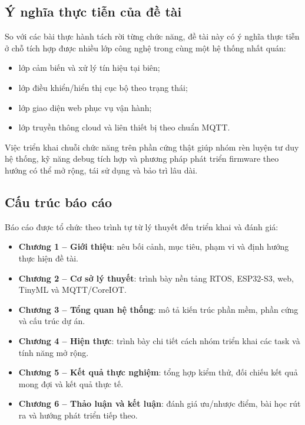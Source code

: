 \subsection{Ý nghĩa thực tiễn của đề tài}

So với các bài thực hành tách rời từng chức năng, đề tài này có ý nghĩa thực tiễn ở chỗ tích hợp được nhiều lớp công nghệ trong cùng một hệ thống nhất quán:
\begin{itemize}
    \item lớp cảm biến và xử lý tín hiệu tại biên;
    \item lớp điều khiển/hiển thị cục bộ theo trạng thái;
    \item lớp giao diện web phục vụ vận hành;
    \item lớp truyền thông cloud và liên thiết bị theo chuẩn MQTT.
\end{itemize}

Việc triển khai chuỗi chức năng trên phần cứng thật giúp nhóm rèn luyện tư duy hệ thống, kỹ năng debug tích hợp và phương pháp phát triển firmware theo hướng có thể mở rộng, tái sử dụng và bảo trì lâu dài.

\subsection{Cấu trúc báo cáo}

Báo cáo được tổ chức theo trình tự từ lý thuyết đến triển khai và đánh giá:
\begin{itemize}
    \item \textbf{Chương 1 -- Giới thiệu}: nêu bối cảnh, mục tiêu, phạm vi và định hướng thực hiện đề tài.
    \item \textbf{Chương 2 -- Cơ sở lý thuyết}: trình bày nền tảng RTOS, ESP32-S3, web, TinyML và MQTT/CoreIOT.
    \item \textbf{Chương 3 -- Tổng quan hệ thống}: mô tả kiến trúc phần mềm, phần cứng và cấu trúc dự án.
    \item \textbf{Chương 4 -- Hiện thực}: trình bày chi tiết cách nhóm triển khai các task và tính năng mở rộng.
    \item \textbf{Chương 5 -- Kết quả thực nghiệm}: tổng hợp kiểm thử, đối chiếu kết quả mong đợi và kết quả thực tế.
    \item \textbf{Chương 6 -- Thảo luận và kết luận}: đánh giá ưu/nhược điểm, bài học rút ra và hướng phát triển tiếp theo.
\end{itemize}


